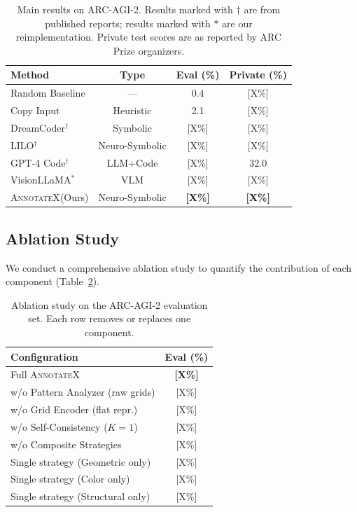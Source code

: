 \documentclass[conference,10pt,letterpaper]{IEEEtran}
\newcommand{\annotatexname}{\textsc{AnnotateX}}
\begin{document}
\begin{table}[t]
\centering
\caption{Main results on ARC-AGI-2. Results marked with $\dagger$ are from published reports; results marked with $*$ are our reimplementation. Private test scores are as reported by ARC Prize organizers.}
\label{tab:main_results}
\begin{tabular}{@{}lccc@{}}
\toprule
\textbf{Method} & \textbf{Type} & \textbf{Eval (\%)} & \textbf{Private (\%)} \\
\midrule
Random Baseline & --- & 0.4 & [X\%] \\
Copy Input & Heuristic & 2.1 & [X\%] \\
DreamCoder$^\dagger$ & Symbolic & [X\%] & [X\%] \\
LILO$^\dagger$ & Neuro-Symbolic & [X\%] & [X\%] \\
GPT-4 Code$^\dagger$ & LLM+Code & [X\%] & 32.0 \\
VisionLLaMA$^*$ & VLM & [X\%] & [X\%] \\
\midrule
\annotatexname (Ours) & Neuro-Symbolic & \textbf{[X\%]} & \textbf{[X\%]} \\
\bottomrule
\end{tabular}
\end{table}

\subsection{Ablation Study}

We conduct a comprehensive ablation study to quantify the contribution of each component (Table~\ref{tab:ablation}).

\begin{table}[t]
\centering
\caption{Ablation study on the ARC-AGI-2 evaluation set. Each row removes or replaces one component.}
\label{tab:ablation}
\begin{tabular}{@{}lc@{}}
\toprule
\textbf{Configuration} & \textbf{Eval (\%)} \\
\midrule
Full \annotatexname & \textbf{[X\%]} \\
w/o Pattern Analyzer (raw grids) & [X\%] \\
w/o Grid Encoder (flat repr.) & [X\%] \\
w/o Self-Consistency ($K{=}1$) & [X\%] \\
w/o Composite Strategies & [X\%] \\
Single strategy (Geometric only) & [X\%] \\
Single strategy (Color only) & [X\%] \\
Single strategy (Structural only) & [X\%] \\
\bottomrule
\end{tabular}
\end{table}
\end{document}

